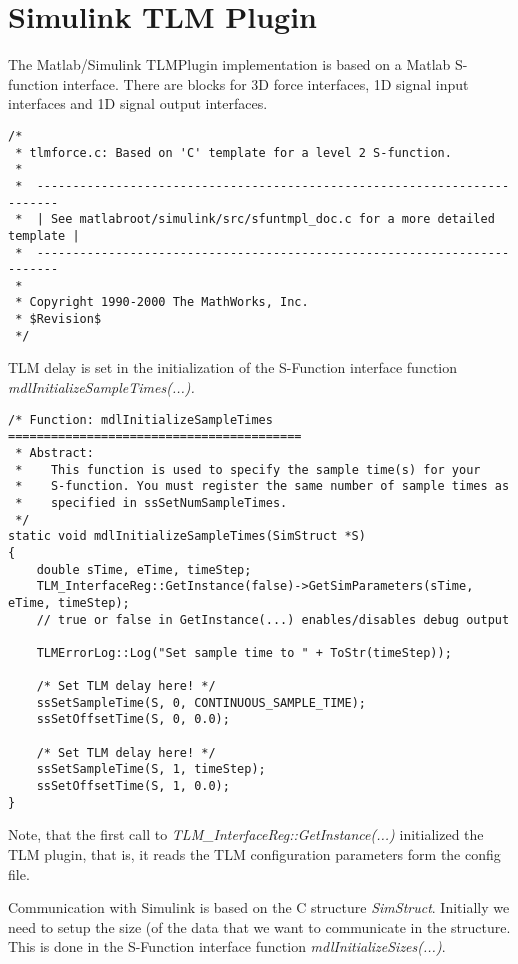\chapter{Simulink TLM Plugin}

The Matlab/Simulink TLMPlugin implementation is based on a Matlab S-function interface.
There are blocks for 3D force interfaces, 1D signal input interfaces and 1D signal output interfaces.

{\scriptsize
\begin{verbatim}
/*
 * tlmforce.c: Based on 'C' template for a level 2 S-function.
 *
 *  -------------------------------------------------------------------------
 *  | See matlabroot/simulink/src/sfuntmpl_doc.c for a more detailed template |
 *  -------------------------------------------------------------------------
 *
 * Copyright 1990-2000 The MathWorks, Inc.
 * $Revision$
 */
\end{verbatim}
}

\noindent TLM delay is set in the initialization of the S-Function interface function {\em mdlInitializeSampleTimes(...).}

{\scriptsize
\begin{verbatim}
/* Function: mdlInitializeSampleTimes =========================================
 * Abstract:
 *    This function is used to specify the sample time(s) for your
 *    S-function. You must register the same number of sample times as
 *    specified in ssSetNumSampleTimes.
 */
static void mdlInitializeSampleTimes(SimStruct *S)
{
    double sTime, eTime, timeStep;
    TLM_InterfaceReg::GetInstance(false)->GetSimParameters(sTime, eTime, timeStep);
    // true or false in GetInstance(...) enables/disables debug output

    TLMErrorLog::Log("Set sample time to " + ToStr(timeStep));

    /* Set TLM delay here! */
    ssSetSampleTime(S, 0, CONTINUOUS_SAMPLE_TIME);
    ssSetOffsetTime(S, 0, 0.0);

    /* Set TLM delay here! */
    ssSetSampleTime(S, 1, timeStep);
    ssSetOffsetTime(S, 1, 0.0);
}
\end{verbatim}
}

\noindent Note, that the first call to {\em TLM\_InterfaceReg::GetInstance(...)} initialized the TLM plugin, that is, it reads the TLM configuration parameters form the config file.

Communication with Simulink is based on the C structure {\em SimStruct}. 
Initially we need to setup the size (of the data that we want to communicate in the structure. 
This is done in the S-Function interface function {\em mdlInitializeSizes(...)}.


